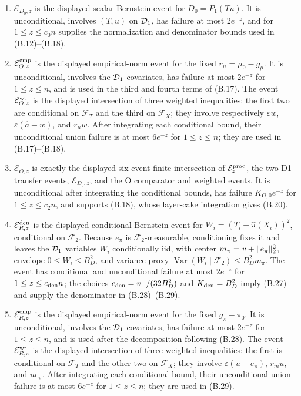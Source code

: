 \begin{enumerate}
\item \(\mathcal E_{D_0,z}\) is the displayed scalar Bernstein event for
\(D_0=P_1(Tu)\).  It is unconditional, involves \((T,u)\) on \(\mathcal D_1\),
has failure at most \(2e^{-z}\), and for \(1\le z\le c_0n\) supplies the
normalization and denominator bounds used in (B.12)--(B.18).

\item \(\mathcal E_{O,z}^{\rm cmp}\) is the displayed empirical-norm
event for the fixed \(r_\mu=\mu_0-g_\mu\).  It is unconditional, involves
the \(\mathcal D_1\) covariates, has failure at most \(2e^{-z}\) for
\(1\le z\le n\), and is used in the third and fourth terms of (B.17).
The event
\(\mathcal E_{O,z}^{\rm wt}\) is the displayed intersection of three
weighted inequalities: the first two are conditional on \(\mathcal F_T\)
and the third on \(\mathcal F_X\); they involve respectively
\(\varepsilon w\), \(\varepsilon(\widehat a-w)\), and \(r_\mu w\).
After integrating each conditional bound, their unconditional union failure
is at most \(6e^{-z}\) for \(1\le z\le n\); they are used in
(B.17)--(B.18).

\item \(\mathcal E_{O,z}\) is exactly the displayed six-event finite
intersection of \(\mathcal E_z^{\rm proc}\), the two D1 transfer events,
\(\mathcal E_{D_0,z}\), and the O comparator and weighted events.  It is
unconditional after integrating the conditional bounds, has failure
\(K_{O,0}e^{-z}\) for \(1\le z\le c_2n\), and supports (B.18), whose
layer-cake integration gives (B.20).

\item \(\mathcal E_{R,z}^{\rm den}\) is the displayed conditional
Bernstein event for \(W_i=(T_i-\widehat\pi(X_i))^2\), conditional on
\(\mathcal F_2\).  Because \(e_\pi\) is \(\mathcal F_2\)-measurable,
conditioning fixes it and leaves the \(\mathcal D_1\) variables \(W_i\)
conditionally iid, with center
\(m_\pi=v+\lVert e_\pi\rVert_2^2\), envelope \(0\le W_i\le B_D^2\), and
variance proxy
\(\operatorname{Var}(W_i\mid\mathcal F_2)\le B_D^2m_\pi\).  The event
has conditional and unconditional failure at most \(2e^{-z}\) for
\(1\le z\le c_{\rm den}n\); the choices
\(c_{\rm den}=v_-/(32B_D^2)\) and \(K_{\rm den}=B_D^2\) imply (B.27) and
supply the denominator in (B.28)--(B.29).

\item \(\mathcal E_{R,z}^{\rm cmp}\) is the displayed empirical-norm
event for the fixed \(g_\pi-\pi_0\).  It is unconditional, involves the
\(\mathcal D_1\) covariates, has failure at most \(2e^{-z}\) for
\(1\le z\le n\), and is used after the decomposition following (B.28).
The event
\(\mathcal E_{R,z}^{\rm wt}\) is the displayed intersection of three
weighted inequalities: the first is conditional on \(\mathcal F_T\) and
the other two on \(\mathcal F_X\); they involve
\(\varepsilon(u-e_\pi)\), \(r_m u\), and \(ue_\pi\).  After integrating
each conditional bound, their unconditional union failure is at most
\(6e^{-z}\) for \(1\le z\le n\); they are used in (B.29).


\end{enumerate}
